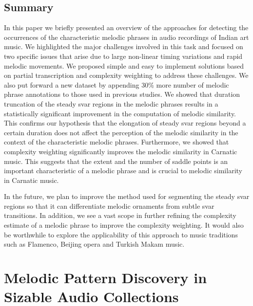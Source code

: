 \subsection{Summary}
\label{sec:patterns_improving_similarity_summary}

In this paper we briefly presented an overview of the approaches for detecting the occurrences of the characteristic melodic phrases in audio recordings of Indian art music. We highlighted the major challenges involved in this task and focused on two specific issues that arise due to large non-linear timing variations and rapid melodic movements. We proposed simple and easy to implement solutions based on partial transcription and complexity weighting to address these challenges. We also put forward a new dataset by appending 30\% more number of melodic phrase annotations to those used in previous studies.  We showed that duration truncation of the steady svar regions in the melodic phrases results in a statistically significant improvement in the computation of melodic similarity. This confirms our hypothesis that the elongation of steady svar regions beyond a certain duration does not affect the perception of the melodic similarity in the context of the characteristic melodic phrases. Furthermore, we showed that  complexity weighting significantly improves the melodic similarity in Carnatic music. This suggests that the extent and the number of saddle points is an important characteristic of a melodic phrase and is crucial to melodic similarity in Carnatic music. 

In the future, we plan to improve the method used for segmenting the steady svar regions so that it can differentiate melodic ornaments from subtle svar transitions. In addition, we see a vast scope in further refining the complexity estimate of a melodic phrase to improve the complexity weighting. It would also be worthwhile to explore the applicability of this approach to music traditions such as Flamenco, Beijing opera and Turkish Makam music.




\section{Melodic Pattern Discovery in Sizable Audio Collections}
\label{sec:patterns_melodic_pattern_discovery}

